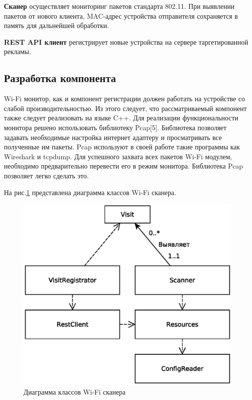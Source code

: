 \textbf{Сканер} осуществляет мониторинг пакетов стандарта 802.11. При выявлении пакетов от нового клиента, MAC-адрес устройства отправителя сохраняется в память для дальнейшей обработки.

\textbf{REST API клиент} регистрирует новые устройства на сервере таргетированной рекламы.

\subsection{Разработка компонента}

Wi-Fi монитор, как и компонент регистрации должен работать на устройстве со слабой производительностью. Из этого следует, что рассматриваемый компонент также следует реализовать на языке C++. Для реализации функциональности монитора решено использовать библиотеку Pcap[5]. Библиотека позволяет задавать необходимые настройка интернет адаптеру и просматривать все полученные им пакеты. Pcap используют в своей работе такие программы как Wireshark и tcpdump. Для успешного захвата всех пакетов Wi-Fi модулем, необходимо предварительно перевести его в режим монитора. Библиотека Pcap позволяет легко сделать это.

На рис.\ref{fig:WiFiScanerUML} представлена диаграмма классов Wi-Fi сканера.

\begin{figure}[H]
	\centering
	\includegraphics[width=\linewidth]{fig/WiFiScanerUML}
	\caption{Диаграмма классов Wi-Fi сканера}
	\label{fig:WiFiScanerUML}
\end{figure}

